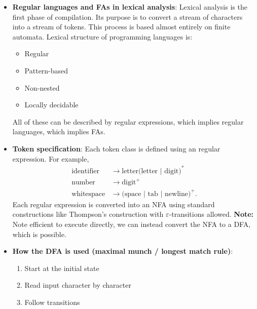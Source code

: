 \documentclass{report}
\begin{document}
\begin{itemize}
            \begin{align*}
                S &\to \varepsilon \; \mid \; aA \\
                A &\to bS
            \end{align*}
            yields $\mathscr{L} = \{(ab)^{n} \ : \ n \geq 0 \} $, which is regular. Notice that all productions are right-linear
        \item \textbf{Regular languages and FAs in lexical analysis}: Lexical analysis is the first phase of compilation. Its purpose is to convert a stream of characters into a stream of tokens.
            \bigbreak \noindent 
            This process is based almost entirely on finite automata. Lexical structure of programming languages is:
            \begin{itemize}
                \item Regular
                \item Pattern-based
                \item Non-nested
                \item Locally decidable
            \end{itemize}
            All of these can be described by regular expressions, which implies regular languages, which implies FAs.
        \item \textbf{Token specification}: Each token class is defined using an regular expression. For example,
            \begin{align*}
                \text{identifier}  &\to \text{letter(letter | digit)}^{*} \\
                \text{number}      &\to \text{digit}^{+} \\
                \text{whitespace}  &\to \text{(space | tab | newline)}^{+}
            .\end{align*}
            Each regular expression is converted into an NFA using standard constructions like Thompson's construction with $\varepsilon$-transitions allowed.
            \bigbreak \noindent 
            \textbf{Note:} Note efficient to execute directly, we can instead convert the NFA to a DFA, which is possible.
        \item \textbf{How the DFA is used (maximal munch / longest match rule)}: 
            \begin{enumerate}
                \item Start at the initial state
                \item Read input character by character
                \item Follow transitions

\end{enumerate}
\end{itemize}
\end{document}
